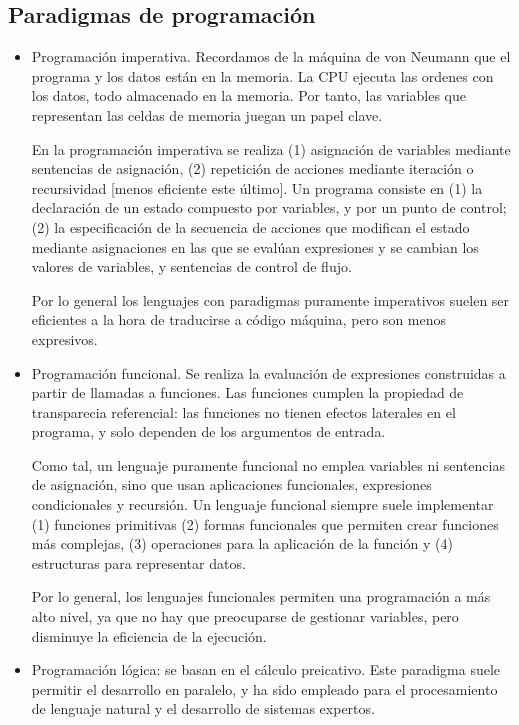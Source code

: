 \documentclass[a4paper]{article}
\begin{document}
	 \subsection{Paradigmas de programación}
	 
	 \begin{itemize}
	 	\item Programación imperativa. Recordamos de la máquina de von Neumann que el programa y los datos están en la memoria. La CPU ejecuta las ordenes con los datos, todo almacenado en la memoria. Por tanto, las variables que representan las celdas de memoria juegan un papel clave.
	 	
	 	En la programación imperativa se realiza (1) asignación de variables mediante sentencias de asignación, (2) repetición de acciones mediante iteración o recursividad [menos eficiente este último]. Un programa consiste en (1) la declaración de un estado compuesto por variables, y por un punto de control; (2) la especificación de la secuencia de acciones que modifican el estado mediante asignaciones en las que se evalúan expresiones y se cambian los valores de variables, y sentencias de control de flujo.
	 	
	 	Por lo general los lenguajes con paradigmas puramente imperativos suelen ser eficientes a la hora de traducirse a código máquina, pero son menos expresivos.
	 	
	 	\item Programación funcional. Se realiza la evaluación de expresiones construidas a partir de llamadas a funciones. Las funciones cumplen la propiedad de transparecia referencial: las funciones no tienen efectos laterales en el programa, y solo dependen de los argumentos de entrada. 
	 	
	 	Como tal, un lenguaje puramente funcional no emplea variables ni sentencias de asignación, sino que usan aplicaciones funcionales, expresiones condicionales y recursión. Un lenguaje funcional siempre suele implementar (1) funciones primitivas (2) formas funcionales que permiten crear funciones más complejas, (3) operaciones para la aplicación de la función y (4) estructuras para representar datos. 
	 	
	 	Por lo general, los lenguajes funcionales permiten una programación a más alto nivel, ya que no hay que preocuparse de gestionar variables, pero disminuye la eficiencia de la ejecución.
	 	
	 	\item Programación lógica: se basan en el cálculo preicativo. Este paradigma suele permitir el desarrollo en paralelo, y ha sido empleado para el procesamiento de lenguaje natural y el desarrollo de sistemas expertos.
	 	

\end{itemize}
\end{document}
